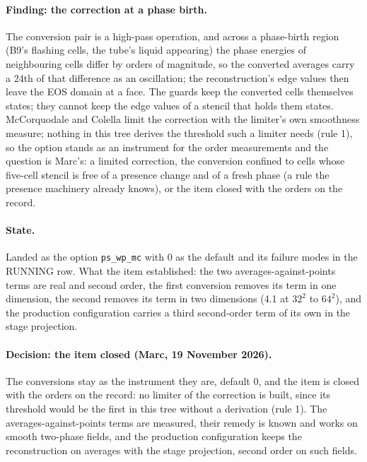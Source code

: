 \documentclass[11pt,a4paper]{article}
\newcommand{\code}[1]{\texttt{\small #1}}
\begin{document}
\paragraph{Finding: the correction at a phase birth.}  The conversion
pair is a high-pass operation, and across a phase-birth region (B9's
flashing cells, the tube's liquid appearing) the phase energies of
neighbouring cells differ by orders of magnitude, so the converted
averages carry a 24th of that difference as an oscillation; the
reconstruction's edge values then leave the EOS domain at a face.  The
guards keep the converted cells themselves states; they cannot keep the
edge values of a stencil that holds them states.  McCorquodale and
Colella limit the correction with the limiter's own smoothness measure;
nothing in this tree derives the threshold such a limiter needs (rule
1), so the option stands as an instrument for the order measurements
and the question is Marc's: a limited correction, the conversion
confined to cells whose five-cell stencil is free of a presence change
and of a fresh phase (a rule the presence machinery already knows), or
the item closed with the orders on the record.

\paragraph{State.}  Landed as the option \code{ps\_wp\_mc} with 0 as the
default and its failure modes in the RUNNING row.  What the item
established: the two averages-against-points terms are real and
second order, the first conversion removes its term in one dimension,
the second removes its term in two dimensions (4.1
at $32^2$ to $64^2$), and the production configuration carries a third
second-order term of its own in the stage projection.

\paragraph{Decision: the item closed (Marc, 19 November 2026).}  The
conversions stay as the instrument they are, default 0, and the item
is closed with the orders on the record: no limiter of the correction
is built, since its threshold would be the first in this tree without a
derivation (rule 1).  The averages-against-points terms are measured,
their remedy is known and works on smooth two-phase fields, and the
production configuration keeps the reconstruction on averages with the
stage projection, second order on such fields.
\end{document}
